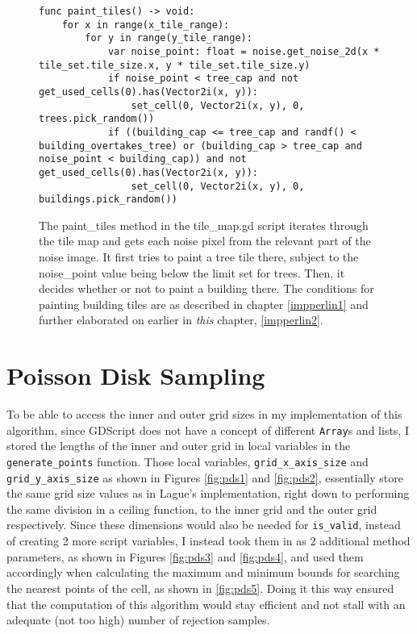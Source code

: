 \begin{figure}[H]
    \centering
    \begin{lstlisting}
func paint_tiles() -> void:
	for x in range(x_tile_range):
		for y in range(y_tile_range):
			var noise_point: float = noise.get_noise_2d(x * tile_set.tile_size.x, y * tile_set.tile_size.y)
			if noise_point < tree_cap and not get_used_cells(0).has(Vector2i(x, y)):
				set_cell(0, Vector2i(x, y), 0, trees.pick_random())
			if ((building_cap <= tree_cap and randf() < building_overtakes_tree) or (building_cap > tree_cap and noise_point < building_cap)) and not get_used_cells(0).has(Vector2i(x, y)):
				set_cell(0, Vector2i(x, y), 0, buildings.pick_random())
    \end{lstlisting}
    \caption{The paint\_tiles method in the tile\_map.gd script iterates through the tile map and gets each noise pixel from the relevant part of the noise image. It first tries to paint a tree tile there, subject to the noise\_point value being below the limit set for trees. Then, it decides whether or not to paint a building there. The conditions for painting building tiles are as described in chapter \ref{impperlin1} and further elaborated on earlier in \textit{this} chapter, \ref{impperlin2}.}
    \label{fig:simplex3}
\end{figure}

\section{Poisson Disk Sampling}

To be able to access the inner and outer grid sizes in my implementation of this algorithm, since GDScript does not have a concept of different \verb|Array|s and lists, I stored the lengths of the inner and outer grid in local variables in the \verb|generate_points| function. Those local variables, \verb|grid_x_axis_size| and \verb|grid_y_axis_size| as shown in Figures \ref{fig:pds1} and \ref{fig:pds2}, essentially store the same grid size values as in Lague's implementation, right down to performing the same division in a ceiling function, to the inner grid and the outer grid respectively. Since these dimensions would also be needed for \verb|is_valid|, instead of creating 2 more script variables, I instead took them in as 2 additional method parameters, as shown in Figures \ref{fig:pds3} and \ref{fig:pds4}, and used them accordingly when calculating the maximum and minimum bounds for searching the nearest points of the cell, as shown in \ref{fig:pds5}. Doing it this way ensured that the computation of this algorithm would stay efficient and not stall with an adequate (not too high) number of rejection samples.

